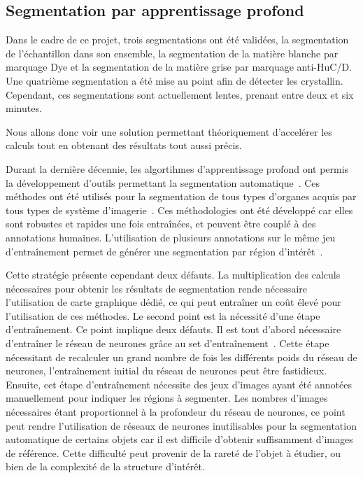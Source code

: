 \documentclass[\main/main.tex]{subfiles}
\begin{document}
    \subsection{Segmentation par apprentissage profond}

%    
Dans le cadre de ce projet,
trois segmentations ont été validées, la segmentation de l'échantillon dans son ensemble,
la segmentation de la matière blanche par marquage Dye et la segmentation de la matière grise par marquage anti-HuC/D.
%
Une quatrième segmentation a été mise au point afin de détecter les crystallin.
%
Cependant, ces segmentations sont actuellement lentes, prenant entre deux et six minutes.

Nous allons donc voir une solution permettant théoriquement d'accelérer les calculs tout en obtenant des résultats tout aussi précis.

%
Durant la dernière décennie, les algortihmes d'apprentissage profond ont permis la développement d'outils permettant la segmentation automatique~\cite{long_2015,ronneberger_2015,Milletari_2016}.
%
Ces méthodes ont été utilisés pour la segmentation de tous types d'organes acquis par tous types de système d'imagerie~\cite{gottapu_2018,oztel_2017,zhang_2020,hossain_2019}.
%
Ces méthodologies ont été développé car elles sont robustes et rapides une fois entraînées, et peuvent être couplé à des annotations humaines. 
%
L'utilisation de plusieurs annotations sur le même jeu d'entraînement permet de générer une segmentation par région d'intérêt~\cite{zhao_2019,tong_2018,feng_2019}.

%
Cette stratégie présente cependant deux défauts.
%
La multiplication des calculs nécessaires pour obtenir les résultats de segmentation rende nécessaire l'utilisation de carte graphique dédié, ce qui peut entraîner un coût élevé pour l'utilisation de ces méthodes.
%
Le second point est la nécessité d'une étape d'entraînement.
%
Ce point implique deux défauts.
%
Il est tout d'abord nécessaire d'entraîner le réseau de neurones grâce au set d'entraînement~\cite{ghafoorian_2017,jiang_2018,xu_2018}.
%
Cette étape nécessitant de recalculer un grand nombre de fois les différents poids du réseau de neurones, l'entraînement initial du réseau de neurones peut être fastidieux.
%
Ensuite, cet étape d'entraînement nécessite des jeux d'images ayant été annotées manuellement pour indiquer les régions à segmenter. 
%
Les nombres d'images nécessaires étant proportionnel à la profondeur du réseau de neurones, ce point peut rendre l'utilisation de réseaux de neurones  inutilisables pour la segmentation automatique de certains objets car il est difficile d'obtenir suffisamment d'images de référence.
%
Cette difficulté peut provenir de la rareté de l'objet à étudier, ou bien de la complexité de la structure d'intérêt.
\end{document}
